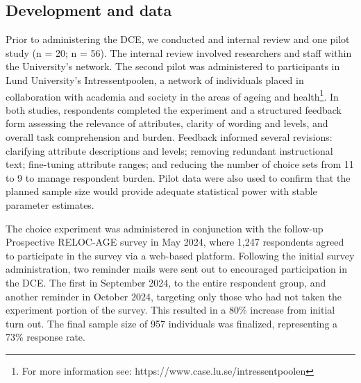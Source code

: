 \documentclass[3p,11pt ]{elsarticle}
\begin{document}
%
%
%
%
%





\subsection{Development and data}

Prior to administering the DCE, we conducted and internal review and one pilot study (n = 20; n = 56).
The internal review involved researchers and staff within the University’s network.
The second pilot was administered to participants in Lund University’s Intressentpoolen,
a network of individuals placed in collaboration with academia and society in the areas of ageing and health\footnote{ For more information see: https://www.case.lu.se/intressentpoolen}.
In both studies, respondents completed the experiment and a structured feedback form assessing the relevance of attributes, clarity of wording and levels, and overall task comprehension and burden.
Feedback informed several revisions: clarifying attribute descriptions and levels; removing redundant instructional text; fine-tuning attribute ranges; and reducing the number of choice sets from 11 to 9 to manage respondent burden. Pilot data were also used to confirm that the planned sample size would provide adequate statistical power with stable parameter estimates.

The choice experiment was administered in conjunction with the follow-up Prospective RELOC-AGE survey in May 2024,
where 1,247 respondents agreed to participate in the survey via a web-based platform.
Following the initial survey administration, 
two reminder mails were sent out to encouraged participation in the DCE.
The first in September 2024,
to the entire respondent group,
and another reminder in October 2024,
targeting only those who had not taken the experiment portion of the survey.
This resulted in a 80\% increase from initial turn out.
The final sample size of 957 individuals was finalized, representing a 73\% response rate.
\end{document}
